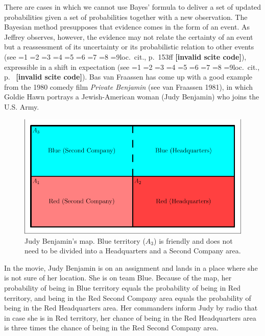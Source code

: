 \documentclass[12pt]{article}
\newcommand{\nonsc}[1]{}
\newif\ifNumericalOrYear
\newcommand{\PageP}{p.~}
\newcommand{\PageP}{}
\newcommand{\nias}{\noindent} %
\newcommand{\scite}[3]{\ifnum#1=1\ifNumericalOrYear\citep{#2}\else\citeyearpar{#2}\fi\else
\ifnum#1=2\ifNumericalOrYear\citep[#3]{#2}\else\citep[{\PageP}#3]{#2}\fi\else
\ifnum#1=3\ifNumericalOrYear(\citet[#3]{#2})\else\citep[{\PageP}#3]{#2}\fi\else
\ifnum#1=4\ifNumericalOrYear\citet{#2}\else\citet{#2}\fi\else
\ifnum#1=5\ifNumericalOrYear(\citet{#2})\else\citep{#2}\fi\else
\ifnum#1=6\ifNumericalOrYear(\citet[#3]{#2})\else\citep[{\PageP}#3]{#2}\fi\else
\ifnum#1=7\ifNumericalOrYear\citep{#2}\else\citealp{#2}\fi\else
\ifnum#1=8\ifNumericalOrYear\citep[#3]{#2}\else\citealp[{\PageP}#3]{#2}\fi\else
\ifnum#1=9\ifNumericalOrYear\citep[#3]{#2}\else{}loc.\ cit., {\PageP}#3\fi\else
\textbf{[invalid scite code]}\fi\fi\fi\fi\fi\fi\fi\fi\fi}
\begin{document}
\nias There are cases in which we cannot use Bayes' formula to deliver
a set of updated probabilities given a set of probabilities together
with a new observation. The Bayesian method presupposes that evidence
comes in the form of an event. As Jeffrey observes, however, the
evidence may not relate the certainty of an event but a reassessment
of its uncertainty or its probabilistic relation to other events (see
\scite{8}{jeffrey65}{153ff}), expressible in a shift in expectation
(see \scite{7}{hobson71}{}). Bas van Fraassen has come up with a good
example from the 1980 comedy film \emph{Private Benjamin} (see van
Fraassen 1981)\nonsc{}, in which Goldie Hawn portrays a
Jewish-American woman (Judy Benjamin) who joins the U.S. Army.

\begin{figure}[h]
  \begin{flushright}
    \begin{minipage}[h]{.8\linewidth}
      \includegraphics[width=\textwidth]{judy.pdf}
      \caption{Judy Benjamin's map. Blue territory ($A_{3}$) is friendly and
        does not need to be divided into a Headquarters and a Second
        Company area.}
      \label{fig:map}
    \end{minipage}
  \end{flushright}
\end{figure}

In the movie, Judy Benjamin is on an assignment and lands in a place
where she is not sure of her location. She is on team Blue. Because of
the map, her probability of being in Blue territory equals the
probability of being in Red territory, and being in the Red Second
Company area equals the probability of being in the Red Headquarters
area. Her commanders inform Judy by radio that in case she is in Red
territory, her chance of being in the Red Headquarters area is three
times the chance of being in the Red Second Company area.
\end{document}
